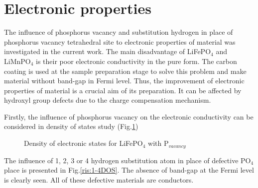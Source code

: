 \section{Electronic properties}

The influence of phosphorus vacancy and substitution hydrogen in place of phosphorus vacancy tetrahedral site to electronic properties of material was investigated in the current work. The main disadvantage of LiFePO$_4$ and LiMnPO$_4$ is their poor electronic conductivity in the pure form. The carbon coating is used at the sample preparation stage to solve this problem and make material without band-gap in Fermi level. Thus, the improvement of electronic properties of material is a crucial aim of its preparation. It can be affected by hydroxyl group defects due to the charge compensation mechanism. 

Firstly, the influence of phosphorus vacancy on the electronic conductivity can be considered in density of states study (Fig.\ref{ris:0DOS})

\begin{figure}[ht]
\caption{Density of electronic states for LiFePO$_4$ with P$_{vacancy}$}
\label{ris:0DOS}
\end{figure}

The influence of 1, 2, 3 or 4 hydrogen substitution atom in place of defective PO$_4$ place is presented in Fig.\ref{ris:1-4DOS}. The absence of band-gap at the Fermi level is clearly seen. All of these defective materials are conductors.

